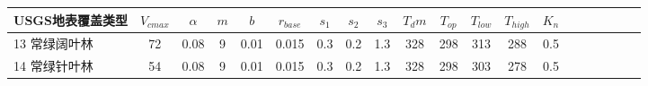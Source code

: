 \begin{sidewaystable}[]
    \centering
    \caption{USGS植被光合作用参数 (续)。$V_{cmax}$表示植被冠层顶部 25\textcelsius 时光合最大羧化速率($\rm mol\ m^{-2}\ s^{-1}$)，$\alpha$为量子转化效率(0.05 $\rm mol\ CO_2\ mol^{-1}$ photon)，$m$为气孔导度经验拟合经验参数(无量纲)，$b$为最小气孔导度($\rm mol\ CO_2\ m^{-2}s^{-1}$) ，
    $r_{base}$为叶基础呼吸速率系数(unitless)，$s_1$是高温抑制系数($\rm K^{-1}$)，$s_2$是低温抑制系数($\rm K^{-1}$)，$s_3$是叶呼吸高温抑制系数($\rm K^{-1}$)和$T_{dm}$是叶呼吸高温抑制温度参数(K)。}
    \label{tab:USGS植被光合作用参数2}
    \begin{tabular}{@{}lccccccccccccccccccc@{}}
    \toprule
    USGS地表覆盖类型     &$ V_{cmax}$ & $\alpha$ & $m$& $b$ & $r_{base}$ & $s_1$ & $s_2$ & $s_3$ & $T_dm$ & $T_{op}$ & $T_{low}$ & $T_{high}$ & $K_n$  \\ \midrule
    13 常绿阔叶林   & 72                                                                & 0.08                                                                                                   & 9                                                                                  & 0.01                                                                               & 0.015                                                               & 0.3                                                       & 0.2                                                       & 1.3                                                       & 328                                                             & 298                                                             & 313                                                              & 288                                                               & 0.5                                                          \\
    14 常绿针叶林   & 54                                                                & 0.08                                                                                                   & 9                                                                                  & 0.01                                                                               & 0.015                                                               & 0.3                                                       & 0.2                                                       & 1.3                                                       & 328                                                             & 298                                                             & 303                                                              & 278                                                               & 0.5                                                          \\

\end{tabular}
\end{sidewaystable}
